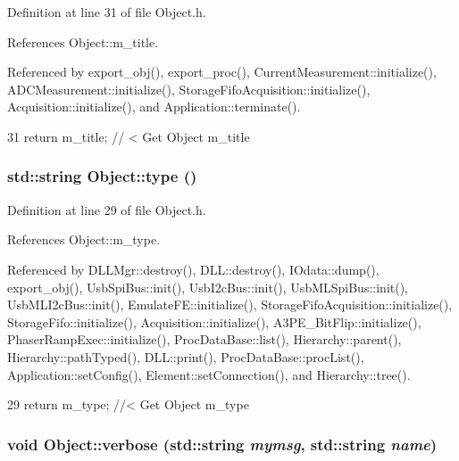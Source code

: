 Definition at line 31 of file Object.h.

References Object::m\_\-title.

Referenced by export\_\-obj(), export\_\-proc(), CurrentMeasurement::initialize(), ADCMeasurement::initialize(), StorageFifoAcquisition::initialize(), Acquisition::initialize(), and Application::terminate().


\begin{DoxyCode}
31 { return m_title;      } // < Get Object m_title
\end{DoxyCode}
\hypertarget{classObject_a84f99f70f144a83e1582d1d0f84e4e62}{
\subsubsection[{type}]{\setlength{\rightskip}{0pt plus 5cm}std::string Object::type ()}}
\label{classObject_a84f99f70f144a83e1582d1d0f84e4e62}


Definition at line 29 of file Object.h.

References Object::m\_\-type.

Referenced by DLLMgr::destroy(), DLL::destroy(), IOdata::dump(), export\_\-obj(), UsbSpiBus::init(), UsbI2cBus::init(), UsbMLSpiBus::init(), UsbMLI2cBus::init(), EmulateFE::initialize(), StorageFifoAcquisition::initialize(), StorageFifo::initialize(), Acquisition::initialize(), A3PE\_\-BitFlip::initialize(), PhaserRampExec::initialize(), ProcDataBase::list(), Hierarchy::parent(), Hierarchy::pathTyped(), DLL::print(), ProcDataBase::procList(), Application::setConfig(), Element::setConnection(), and Hierarchy::tree().


\begin{DoxyCode}
29 { return m_type;       } //< Get Object m_type
\end{DoxyCode}
\hypertarget{classObject_a2d4120195317e2a3c6532e8bb9f3da68}{
\subsubsection[{verbose}]{\setlength{\rightskip}{0pt plus 5cm}void Object::verbose (std::string {\em mymsg}, \/  std::string {\em name})}}
\label{classObject_a2d4120195317e2a3c6532e8bb9f3da68}


